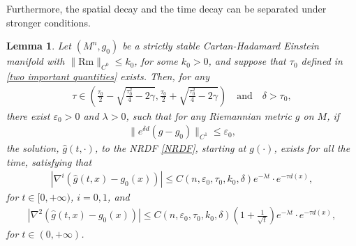 \documentclass[12pt]{amsart}
\newtheorem{lemma}{Lemma}[section]
\begin{document}
Furthermore, the spatial decay and the time decay can be separated under stronger conditions. 
\begin{lemma}\label{long time existence with weight}
    Let $(M^n, g_0)$ be a strictly stable Cartan-Hadamard Einstein manifold with $\|\mathrm{Rm}\|_{C^0} \leq k_0$, for some $k_0 > 0$, and suppose that $\tau_0$ defined in \eqref{two important quantities} exists.
    Then, for any 
    \begin{align}
        \tau \in \left(\frac{\tau_0}{2} - \sqrt{\frac{\tau_0^2}{4} - 2\gamma}, \frac{\tau_0}{2} + \sqrt{\frac{\tau_0^2}{4} - 2\gamma} \right) \quad \text{and} \quad \delta > \tau_0,
    \end{align}
    there exist $\varepsilon_0 > 0$ and $\lambda > 0$, such that for any Riemannian metric $g$ on $M$, if 
    \begin{align}\label{long time eistence with weight condition1}
        \|e^{\delta d}(g - g_0)\|_{C^{1}} \leq  \varepsilon_0,
    \end{align}
    the solution, $\hat{g}(t, \cdot)$, to the NRDF \eqref{NRDF}, starting at $g(\cdot)$, exists for all the time, satisfying that 
    \begin{align}\label{long time with weight result 1}
        |\nabla^i(\hat{g}(t,x) - g_0(x))| \leq C(n,\varepsilon_0,\tau_0, k_0, \delta) e^{-\lambda t}\cdot e^{-\tau d(x)},
    \end{align}
    for $t\in [0, +\infty)$, $i = 0, 1$, and 
    \begin{align}\label{long time with weight result 2}
        |\nabla^2(\hat{g}(t,x) - g_0(x))| \leq C(n,\varepsilon_0,\tau_0, k_0, \delta)(1 + \frac{1}{\sqrt{t}}) e^{-\lambda t}\cdot e^{-\tau d(x)},
    \end{align}
    for $t\in (0, +\infty)$.
\end{lemma}
\end{document}
